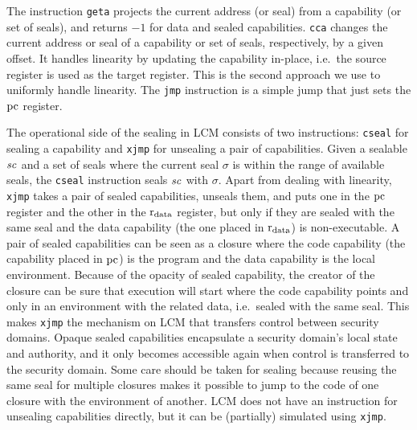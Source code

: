 \documentclass[acmsmall,review,anonymous]{acmart}\settopmatter{printfolios=true,printccs=false,printacmref=false}
\newcommand{\trgcm}{\textsc{LCM}}
\begin{document}
The instruction \texttt{geta} projects the current address (or seal) from a capability (or set of seals), and returns $-1$ for data and sealed capabilities.
\texttt{cca} changes the current address or seal of a capability or set of seals, respectively, by a given offset.
It handles linearity by updating the capability in-place, i.e.\ the source register is used as the target register.
This is the second approach we use to uniformly handle linearity.
The \texttt{jmp} instruction is a simple jump that just sets the $\mathrm{pc}$ register.

The operational side of the sealing in \trgcm{} consists of two instructions: \texttt{cseal} for sealing a capability and \texttt{xjmp} for unsealing a pair of capabilities.
Given a sealable $\mathit{sc}$ and a set of seals where the current seal $\sigma$ is within the range of available seals, the \texttt{cseal} instruction seals $\mathit{sc}$ with $\sigma$.
Apart from dealing with linearity, \texttt{xjmp} takes a pair of sealed capabilities, unseals them, and puts one in the $\mathrm{pc}$ register and the other in the $\mathrm{r}_\mathrm{data}$ register, but only if they are sealed with the same seal and the data capability (the one placed in $\mathrm{r}_\mathrm{data}$) is non-executable.
A pair of sealed capabilities can be seen as a closure where the code capability (the capability placed in $\mathrm{pc}$) is the program and the data capability is the local environment.
Because of the opacity of sealed capability, the creator of the closure can be sure that execution will start where the code capability points and only in an environment with the related data, i.e.\ sealed with the same seal.
This makes \texttt{xjmp} the mechanism on \trgcm{} that transfers control between security domains.
Opaque sealed capabilities encapsulate a security domain's local state and authority, and it only becomes accessible again when control is transferred to the security domain.
Some care should be taken for sealing because reusing the same seal for multiple closures makes it possible to jump to the code of one closure with the environment of another.
\trgcm{} does not have an instruction for unsealing capabilities directly, but it can be (partially) simulated using \texttt{xjmp}.
\end{document}
